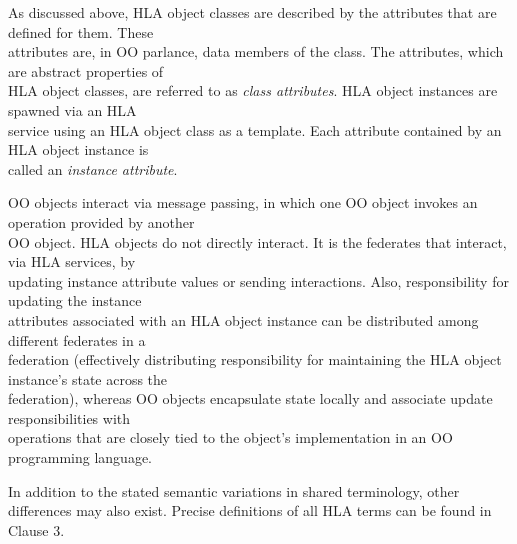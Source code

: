 \vspace{6pt}
As discussed above, HLA object classes are described by the attributes that are defined for them. These\\
attributes are, in OO parlance, data members of the class. The attributes, which are abstract properties of\\
HLA object classes, are referred to as \textit{class attributes}. HLA object instances are spawned via an HLA\\
service using an HLA object class as a template. Each attribute contained by an HLA object instance is\\
called an \textit{instance attribute}.

\vspace{6pt}
OO objects interact via message passing, in which one OO object invokes an operation provided by another\\
OO object. HLA objects do not directly interact. It is the federates that interact, via HLA services, by\\
updating instance attribute values or sending interactions. Also, responsibility for updating the instance\\
attributes associated with an HLA object instance can be distributed among different federates in a\\
federation (effectively distributing responsibility for maintaining the HLA object instance's state across the\\
federation), whereas OO objects encapsulate state locally and associate update responsibilities with\\
operations that are closely tied to the object's implementation in an OO programming language.

\newpage

In addition to the stated semantic variations in shared terminology, other differences may also exist. Precise definitions of all HLA terms can be found in Clause 3.
